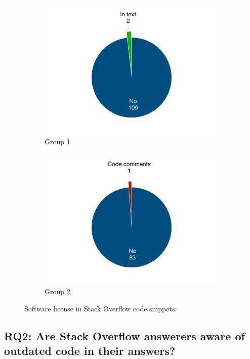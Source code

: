 \documentclass{svjour3}                     %
\begin{document}
\begin{figure}
	\begin{subfigure}{5\textwidth}
		\centering
		\includegraphics[width=.6\linewidth]{survey_license_1}
		\caption{Group 1}
		\label{fig:survey_license_1}
	\end{subfigure}%
	\begin{subfigure}{.25\textwidth}
		\centering
		\includegraphics[width=.6\linewidth]{survey_license_2}
		\caption{Group 2}
		\label{fig:survey_license_2}
	\end{subfigure}
	\caption{Software license in Stack Overflow code snippets.}
	\label{fig:survey_license}
\end{figure}

\subsection{RQ2: Are Stack Overflow answerers aware of outdated code in their answers?}

\vspace{0.5cm}
\noindent{}
\vspace{0.5cm}
\end{document}
